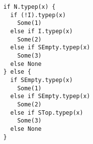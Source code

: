 \begin{lstlisting}[style=scalaioScala]
if N.typep(x) {
  if (!I).typep(x)
    Some(1)
  else if I.typep(x)
    Some(2)
  else if SEmpty.typep(x)
    Some(3)
  else None
} else {
  if SEmpty.typep(x)
    Some(1)
  else if SEmpty.typep(x)
    Some(2)
  else if STop.typep(x)
    Some(3)
  else None
}
\end{lstlisting}
